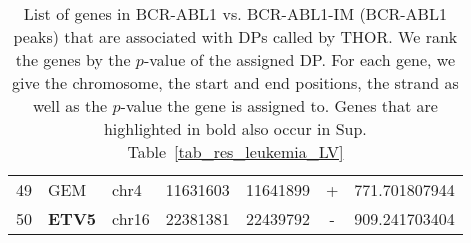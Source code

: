 \begin{table}
\begin{tabular}{rllrrcr}
49 & GEM & chr4 & 11631603 & 11641899 & + & 771.701807944 \\
50 & \textbf{ETV5} & chr16 & 22381381 & 22439792 & - & 909.241703404 \\
 \end{tabular}
\caption[List of genes associated with DP-IM]{List of genes in BCR-ABL1 vs. BCR-ABL1-IM (BCR-ABL1 peaks) that are associated with DPs called by THOR.
We rank the genes by the $p$-value of the assigned DP.
For each gene, we give the chromosome, the start and end positions, the strand as well as the $p$-value the gene is assigned to.
Genes that are highlighted in bold also occur in Sup. Table~\ref{tab_res_leukemia_LV}}
\label{tab_res_leukemia_IM}
\end{table}
